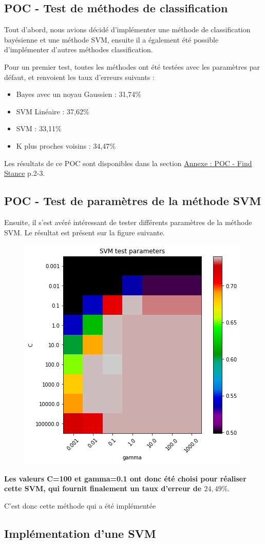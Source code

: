 \subsection{POC - Test de méthodes de classification}

Tout d'abord, nous avions décidé d'implémenter une méthode de classification bayésienne et une méthode SVM, ensuite il a également été possible d'implémenter d'autres méthodes classification.

Pour un premier test, toutes les méthodes ont été testées avec les paramètres par défaut, et renvoient les taux d'erreurs suivants :
\begin{itemize}
\item Bayes avec un noyau Gaussien : 31,74$\%$
\item SVM Linéaire : 37,62$\%$
\item SVM : 33,11$\%$
\item K plus proches voisins : 34,47$\%$
\end{itemize}

Les résultats de ce POC sont disponibles dans la section \hyperref[annexe-stance-detection]{Annexe : POC - Find Stance} p.2-3.

\subsection{POC - Test de paramètres de la méthode SVM}

Ensuite, il s'est avéré intéressant de tester différents paramètres de la méthode SVM. Le résultat est présent sur la figure suivante.

\begin{figure}[!h]
\centering
\includegraphics{src/annexes/POC_FindStance_V2/output_24_0.png}
\end{figure}

\textbf{Les valeurs C=100 et gamma=0.1 ont donc été choisi pour réaliser cette SVM, qui fournit finalement un taux d'erreur de $24,49\%$}.

C'est donc cette méthode qui a été implémentée
\subsection{Implémentation d'une SVM}




